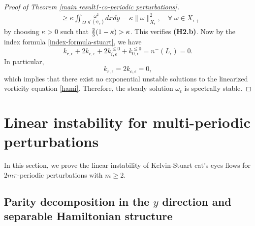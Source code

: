 \documentclass[1 [leqno, 11pt]{amsart}
\numberwithin{equation}{section}
\let\ep=\epsilon
\begin{document}
\begin{CJK*}{GBK}{song}
\begin{proof}[Proof of Theorem \ref{main result1-co-periodic perturbations}]
\begin{align}
& \geq \kappa\iint_\Omega \frac{\omega^2}{g'(\psi_\ep)} dxdy=\kappa\|\omega\|_{X_\ep}^2, \quad\forall \; \omega \in X_{\ep+}
\end{align}
by choosing $\kappa > 0$ such that ${2\over3}(1-\kappa) > \kappa$. This verifies \textbf{(H2.b)}. Now by the index formula \eqref{index-formula-stuart}, we have
  $$k_{r,\ep} + 2k_{c,\ep}+2k_{i,\ep}^{\leq0}+k_{0,\ep}^{\leq0}  = n^-(L_\epsilon) = 0.$$
In particular, $$k_{r,\ep} = 2k_{c,\ep}= 0,$$
which implies that there exist no exponential unstable solutions to the linearized vorticity equation \eqref{hami}. Therefore, the steady solution $\omega_\ep$ is spectrally stable.
\end{proof}

\section{Linear instability for  multi-periodic perturbations}\label{multi-periodic-linear}
In this section, we prove the linear instability of Kelvin-Stuart cat's eyes flows for $2m\pi$-periodic perturbations with $m\geq2$.
\subsection{Parity decomposition in the $y$ direction and separable Hamiltonian structure}


\end{CJK*}
\end{document}
